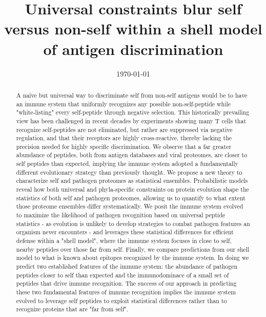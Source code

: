 \documentclass[superscriptaddress,twocolumn,pre]{revtex4}
\newcommand{\<}{\langle}
\renewcommand{\>}{\rangle}
\begin{document}
\title{Universal constraints blur self versus non-self within a shell model of antigen discrimination}
\date{\today}

\begin{abstract}
A naïve but universal way to discriminate self from non-self antigens would be to have an immune system that uniformly recognizes any possible non-self-peptide while "white-listing" every self-peptide through negative selection. This historically prevailing view has been challenged in recent decades by experiments showing many T cells that recognize self-peptides are not eliminated, but rather are suppressed via negative regulation, and that their receptors are highly cross-reactive, thereby lacking the precision needed for highly specific discrimination. We observe that a far greater abundance of peptides, both from antigen databases and viral proteomes, are closer to self peptides than expected, implying the immune system adopted a fundamentally different evolutionary strategy than previously thought. We propose a new theory to characterize self and pathogen proteomes as statistical ensembles. Probabilistic models reveal how both universal and phyla-specific constraints on protein evolution shape the statistics of both self and pathogen proteomes, allowing us to quantify to what extent those proteome ensembles differ systematically. We posit the immune system evolved to maximize the likelihood of pathogen recognition based on universal peptide statistics - as evolution is unlikely to develop strategies to combat pathogen features an organism never encounters - and leverages these statistical differences for efficient defense within a "shell model", where the immune system focuses in close to self, nearby peptides over those far from self. Finally, we compare predictions from our shell model to what is known about epitopes recognized by the immune system. In doing we predict two established features of the immune system: the abundance of pathogen peptides closer to self than expected and the immunodominace of a small set of peptides that drive immune recognition. The success of our approach in predicting these two fundamental features of immune recognition implies the immune system evolved to leverage self peptides to exploit statistical differences rather than to recognize proteins that are "far from self".
\end{abstract}
\end{document}
